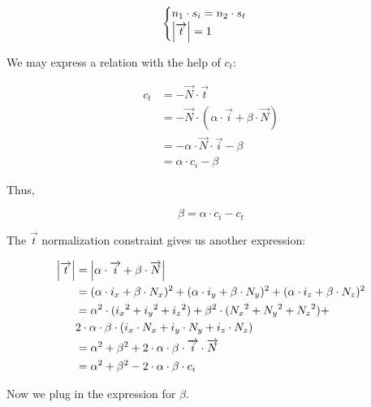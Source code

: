 \begin{equation} \begin{cases}
n_1 \cdot s_i = n_2 \cdot s_t \\
\abs{\overrightarrow{t}} = 1
\end{cases} \end{equation}

We may express a relation with the help of $c_t$:

\begin{equation} \begin{split}
c_t &= - \overrightarrow{N} \cdot \overrightarrow{t} \\
&= - \overrightarrow{N} \cdot
   (\alpha \cdot \overrightarrow{i} + \beta \cdot \overrightarrow{N}) \\
&= - \alpha \cdot \overrightarrow{N} \cdot \overrightarrow{i} - \beta \\
&= \alpha \cdot c_i - \beta
\end{split} \end{equation}

Thus,

\begin{equation}
\beta = \alpha \cdot c_i - c_t
\end{equation}

The $\overrightarrow{t}$ normalization constraint gives us another expression:

\begin{equation} \begin{split}
\abs{\overrightarrow{t}} &= \abs{\alpha \cdot \overrightarrow{i}
                                 + \beta \cdot \overrightarrow{N}} \\
&= (\alpha \cdot i_x + \beta \cdot N_x)^2 +
   (\alpha \cdot i_y + \beta \cdot N_y)^2 +
   (\alpha \cdot i_z + \beta \cdot N_z)^2 \\
&= \alpha^2 \cdot ({i_x}^2 + {i_y}^2 + {i_z}^2) +
   \beta^2 \cdot ({N_x}^2 + {N_y}^2 + {N_z}^2) + \\
   & 2 \cdot \alpha \cdot \beta \cdot
     (i_x \cdot N_x + i_y \cdot N_y + i_z \cdot N_z) \\
&= \alpha^2 + \beta^2 + 2 \cdot \alpha \cdot \beta \cdot \overrightarrow{i}
   \cdot \overrightarrow{N} \\
&= \alpha^2 + \beta^2 - 2 \cdot \alpha \cdot \beta \cdot c_i
\end{split} \end{equation}

Now we plug in the expression for $\beta$.

